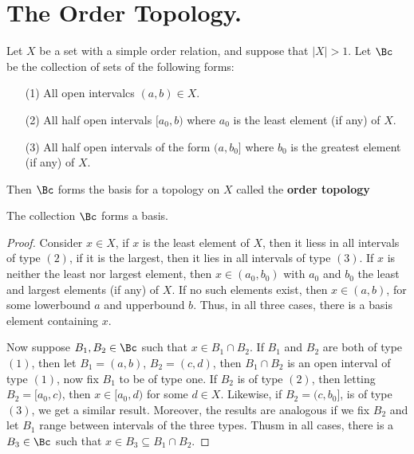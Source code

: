 
\section{The Order Topology.}

\begin{definition}
    Let $X$ be a set with a simple order relation, and suppose that  $|X|>1$. Let $\Bc$
    be the collection of sets of the following forms:
        \begin{enumerate}
            \item[(1)] All open intervalcs $(a,b) \in X$.

            \item[(2)] All half open intervals $[a_0,b)$ where $a_0$ is the least element
                (if any) of $X$.

            \item[(3)] All half open intervals of the form  $(a,b_0]$ where $b_0$ is the greatest
                element (if any) of $X$.
        \end{enumerate}
    Then $\Bc$ forms the basis for a topology on  $X$ called the \textbf{order topology}
\end{definition}

\begin{theorem}\label{1.3.1}
    The collection $\Bc$ forms a basis.
\end{theorem}
\begin{proof}
    Consider $x \in X$, if  $x$ is the least element of  $X$, then it liess in all
    intervals of type $(2)$, if it is the largest, then it lies in all intervals of type
    $(3)$. If $x$ is neither the least nor largest element, then $x \in (a_0,b_0)$ with
    $a_0$ and $b_0$ the least and largest elements (if any) of $X$. If no such elements
    exist, then $x \in (a,b)$, for some lowerbound $a$ and upperbound $b$. Thus, in all three
    cases, there is a basis element containing  $x$.

    Now suppose $B_1,B_2 \in \Bc$ such that $x \in B_1 \cap B_2$. If $B_1$ and $B_2$ are
    both of type $(1)$, then let  $B_1=(a,b)$, $B_2=(c,d)$, then $B_1 \cap B_2$ is an
    open interval of type $(1)$, now fix  $B_1$ to be of type one. If $B_2$ is of type $(2)$, then
    letting  $B_2=[a_0,c)$, then $x \in [a_0,d)$ for some $d \in X$. Likewise, if  $B_2=(c,b_0]$,
    is of type $(3)$, we get a similar result. Moreover, the results are analogous if we
    fix  $B_2$ and let $B_1$ range between intervals of the three types. Thusm in all cases, there
    is a $B_3 \in \Bc$ such that $x \in B_3 \subseteq B_1 \cap B_2$.
\end{proof}


